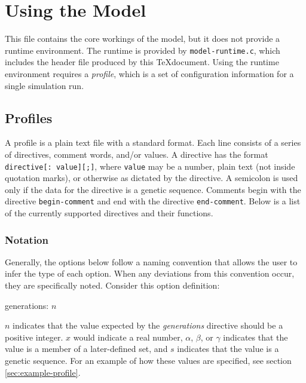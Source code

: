 \documentclass{article}
\begin{document}
  \section{Using the Model}
    \label{sec:using}

    This file contains the core workings of the model, but it does not provide a
    runtime environment. The runtime is provided by \verb|model-runtime.c|,
    which includes the header file produced by this \TeX document. Using the
    runtime environment requires a {\em profile}, which is a set of
    configuration information for a single simulation run.

    \subsection{Profiles}
      \label{sec:profiles}

      A profile is a plain text file with a standard format. Each line consists
      of a series of directives, comment words, and/or values. A directive has
      the format \verb|directive[: value][;]|, where \verb|value| may be a
      number, plain text (not inside quotation marks), or otherwise as dictated
      by the directive. A semicolon is used only if the data for the directive
      is a genetic sequence. Comments begin with the directive
      \verb|begin-comment| and end with the directive \verb|end-comment|. Below
      is a list of the currently supported directives and their functions.

      \subsubsection{Notation}
        \label{sec:notation}

        Generally, the options below follow a naming convention that allows the
        user to infer the type of each option. When any deviations from this
        convention occur, they are specifically noted. Consider this option
        definition:

        \begin{center}
          generations: $n$
        \end{center}

        \noindent $n$ indicates that the value expected by the {\em generations}
        directive should be a positive integer. $x$ would indicate a real
        number, $\alpha$, $\beta$, or $\gamma$ indicates that the value is a
        member of a later-defined set, and $s$ indicates that the value is a
        genetic sequence. For an example of how these values are specified, see
        section \ref{sec:example-profile}.
\end{document}
